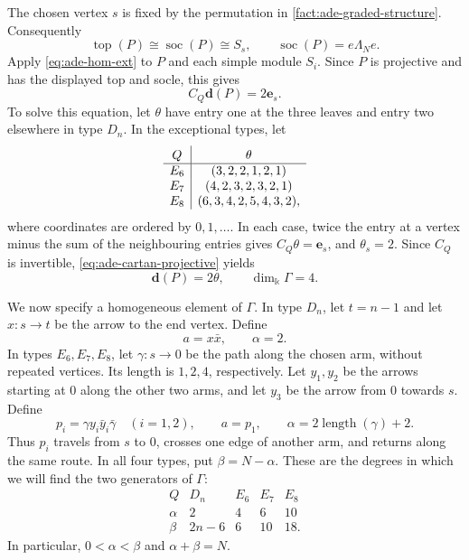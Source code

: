 \documentclass[a4paper,11pt,reqno]{amsart}
\theoremstyle{definition}
\theoremstyle{plain}
\numberwithin{equation}{section}
\newcommand{\kk}{\Bbbk}
\begin{document}
The chosen vertex \(s\) is fixed by the permutation in
\cref{fact:ade-graded-structure}.  Consequently
\[
 \operatorname{top}(P)\cong\operatorname{soc}(P)\cong S_s,
 \qquad\operatorname{soc}(P)=e\Lambda_Ne.
\]
Apply \eqref{eq:ade-hom-ext} to \(P\) and each simple module
\(S_i\).  Since \(P\) is projective and has the displayed top
and socle, this gives
\begin{equation}
\label{eq:ade-cartan-projective}
 C_Q\mathbf d(P)=2\mathbf e_s.
\end{equation}
To solve this equation, let \(\theta\) have entry one at the
three leaves and entry two elsewhere in type \(D_n\).  In the
exceptional types, let
\begin{equation}
\label{eq:ade-projective-dimensions}
\begin{array}{c|c}
 Q&\theta\rule{0pt}{2.4ex}\\\hline
 E_6&(3,2,2,1,2,1)\\
 E_7&(4,2,3,2,3,2,1)\\
 E_8&(6,3,4,2,5,4,3,2),
\end{array}
\end{equation}
where coordinates are ordered by \(0,1,\ldots\).
In each case, twice the entry at a vertex minus the sum of the
neighbouring entries gives
\(C_Q\theta=\mathbf e_s\), and \(\theta_s=2\).
Since \(C_Q\) is invertible, \eqref{eq:ade-cartan-projective} yields
\begin{equation}
\label{eq:ade-half-projective}
 \mathbf d(P)=2\theta,\qquad\dim_\kk\Gamma=4.
\end{equation}

We now specify a homogeneous element of \(\Gamma\).
In type \(D_n\), let \(t=n-1\) and let \(x:s\to t\) be
the arrow to the end vertex.  Define
\[
 a=x\bar x,\qquad\alpha=2.
\]
In types \(E_6,E_7,E_8\), let \(\gamma:s\to0\) be the
path along the chosen arm, without repeated vertices.  Its length
is \(1,2,4\), respectively.  Let \(y_1,y_2\) be the arrows
starting at \(0\) along the other two arms, and let \(y_3\)
be the arrow from \(0\) towards \(s\).  Define
\[
 p_i=\gamma y_i\bar y_i\bar\gamma\quad(i=1,2),
 \qquad a=p_1,\qquad\alpha=2\operatorname{length}(\gamma)+2.
\]
Thus \(p_i\) travels from \(s\) to \(0\), crosses one edge
of another arm, and returns along the same route.
In all four types, put \(\beta=N-\alpha\).  These are the
degrees in which we will find the two generators of \(\Gamma\):
\begin{equation}
\label{eq:trivalent-degree-data}
\begin{array}{c|cccc}
 Q&D_n&E_6&E_7&E_8\\\hline
 \alpha&2&4&6&10\\
 \beta&2n-6&6&10&18.
\end{array}
\end{equation}
In particular, \(0<\alpha<\beta\) and \(\alpha+\beta=N\).
\end{document}
